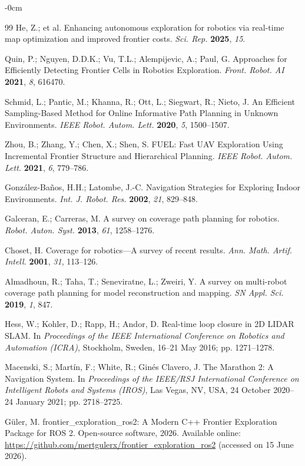 \documentclass[sensors,article,submit,pdftex,moreauthors]{Definitions/mdpi}
\begin{document}
\begin{adjustwidth}{-\extralength}{0cm}
\begin{thebibliography}{99}
He, Z.; et al. Enhancing autonomous exploration for robotics via real-time map optimization and improved frontier costs. \textit{Sci. Rep.} \textbf{2025}, \textit{15}.

Quin, P.; Nguyen, D.D.K.; Vu, T.L.; Alempijevic, A.; Paul, G. Approaches for Efficiently Detecting Frontier Cells in Robotics Exploration. \textit{Front. Robot. AI} \textbf{2021}, \textit{8}, 616470.

Schmid, L.; Pantic, M.; Khanna, R.; Ott, L.; Siegwart, R.; Nieto, J. An Efficient Sampling-Based Method for Online Informative Path Planning in Unknown Environments. \textit{IEEE Robot. Autom. Lett.} \textbf{2020}, \textit{5}, 1500--1507.

Zhou, B.; Zhang, Y.; Chen, X.; Shen, S. FUEL: Fast UAV Exploration Using Incremental Frontier Structure and Hierarchical Planning. \textit{IEEE Robot. Autom. Lett.} \textbf{2021}, \textit{6}, 779--786.

Gonz\'alez-Ba\~nos, H.H.; Latombe, J.-C. Navigation Strategies for Exploring Indoor Environments. \textit{Int. J. Robot. Res.} \textbf{2002}, \textit{21}, 829--848.

Galceran, E.; Carreras, M. A survey on coverage path planning for robotics. \textit{Robot. Auton. Syst.} \textbf{2013}, \textit{61}, 1258--1276.

Choset, H. Coverage for robotics---A survey of recent results. \textit{Ann. Math. Artif. Intell.} \textbf{2001}, \textit{31}, 113--126.

Almadhoun, R.; Taha, T.; Seneviratne, L.; Zweiri, Y. A survey on multi-robot coverage path planning for model reconstruction and mapping. \textit{SN Appl. Sci.} \textbf{2019}, \textit{1}, 847.

Hess, W.; Kohler, D.; Rapp, H.; Andor, D. Real-time loop closure in 2D LIDAR SLAM. In \textit{Proceedings of the IEEE International Conference on Robotics and Automation (ICRA)}, Stockholm, Sweden, 16--21 May 2016; pp. 1271--1278.

Macenski, S.; Mart\'in, F.; White, R.; Gin\'es Clavero, J. The Marathon 2: A Navigation System. In \textit{Proceedings of the IEEE/RSJ International Conference on Intelligent Robots and Systems (IROS)}, Las Vegas, NV, USA, 24 October 2020--24 January 2021; pp. 2718--2725.

G\"uler, M. frontier\_exploration\_ros2: A Modern C++ Frontier Exploration Package for ROS 2. Open-source software, 2026. Available online: \url{https://github.com/mertgulerx/frontier_exploration_ros2} (accessed on 15 June 2026).


\end{thebibliography}
\end{adjustwidth}
\end{document}
